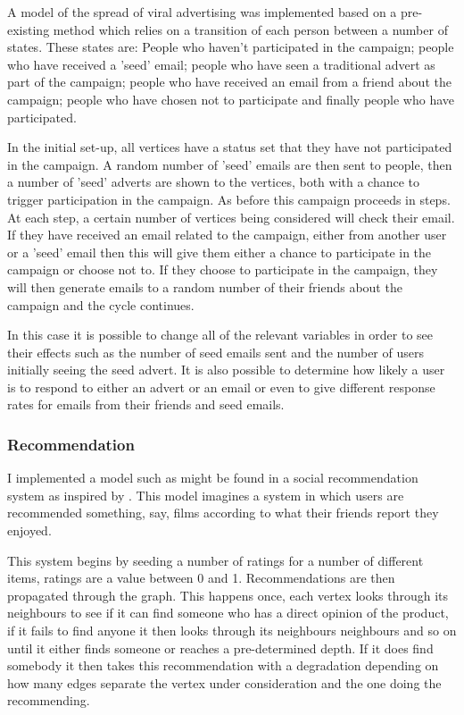 \documentclass[12pt,a4paper]{article}
\begin{document}
A model of the spread of viral advertising was implemented based on a pre-existing method \cite{van2010viral} which relies on a transition of each person between a number of states. These states are: People who haven't participated in the campaign; people who have received a 'seed' email; people who have seen a traditional advert as part of the campaign;  people who have received an email from a friend about the campaign; people who have chosen not to participate and finally people who have participated.

In the initial set-up, all vertices have a status set that they have not participated in the campaign. A random number of 'seed' emails are then sent to people, then a number of 'seed' adverts are shown to the vertices, both with a chance to trigger participation in the campaign. As before this campaign proceeds in steps. At each step, a certain number of vertices being considered will check their email. If they have received an email related to the campaign, either from another user or a 'seed' email then this will give them either a chance to participate in the campaign or choose not to. If they choose to participate in the campaign, they will then generate emails to a random number of their friends about the campaign and the cycle continues.

In this case it is possible to change all of the relevant variables in order to see their effects such as the number of seed emails sent and the number of users initially seeing the seed advert. It is also possible to determine how likely a user is to respond to either an advert or an email or even to give different response rates for emails from their friends and seed emails.

\subsubsection{Recommendation}

I implemented a model such as might be found in a social recommendation system as inspired by \cite{walter2008model}. This model imagines a system in which users are recommended something, say, films according to what their friends report they enjoyed.

This system begins by seeding a number of ratings for a number of different items, ratings are a value between 0 and 1. Recommendations are then propagated through the graph. This happens once, each vertex looks through its neighbours to see if it can find someone who has a direct opinion of the product, if it fails to find anyone it then looks through its neighbours neighbours and so on until it either finds someone or reaches a pre-determined depth. If it does find somebody it then takes this recommendation with a degradation depending on how many edges separate the vertex under consideration and the one doing the recommending.
\end{document}
